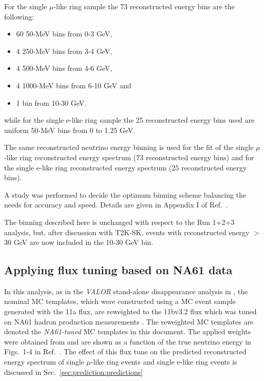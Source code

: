 For the single $\mu$-like ring sample the 73 reconstructed energy bins are the following:
\begin{itemize}
 \item   60 50-MeV bins from 0-3 GeV, 
 \item   4 250-MeV bins from 3-4 GeV, 
 \item   4 500-MeV bins from 4-6 GeV, 
 \item   4 1000-MeV bins from 6-10 GeV and
 \item   1 bin from 10-30 GeV.
\end{itemize}
while for the single e-like ring sample the 25 reconstructed energy bins used are 
uniform 50-MeV bins from 0 to 1.25 GeV.

The same reconstructed neutrino energy binning is used for the fit of the single $\mu$-like ring reconstructed energy spectrum (73 reconstructed energy bins) and for the single e-like ring reconstructed energy spectrum (25 reconstructed energy bins).

A study was performed to decide the optimum binning scheme balancing the needs for accuracy and speed.
Details are given in Appendix I of Ref.\ \cite{OurRun123DisappAnalysis3Flavour}.

The binning described here is unchanged with respect to the Run 1+2+3 analysis,
but, after discussion with T2K-SK, events with reconstructed energy $>$30 GeV are now included in
the 10-30 GeV bin.



\subsection{Applying flux tuning based on NA61 data}
\label{sec:prediction:NA61}

In this analysis, as in the {\em VALOR} stand-alone disappearance analysis in \cite{OurRun1234DisappAnalysis3Flavour},
 the nominal MC templates, which were constructed using a MC event sample generated with the 11a flux,
are reweighted to the 11bv3.2 flux which was tuned on NA61 hadron production measurements \cite{FluxTuning}\cite{NA61T2K}.
The reweighted MC templates are denoted the {\em NA61-tuned} MC templates in this document.
The applied weights were obtained from \cite{FluxTuningHistograms} and are shown as a function of the true neutrino energy 
in Figs.\ 1-4 in Ref.\ \cite{OurRun123DisappAnalysis3Flavour}.
The effect of this flux tune on the predicted reconstructed energy spectrum of 
single $\mu$-like ring events and single e-like ring events is discussed in Sec.\ \ref{sec:prediction:predictions} 



